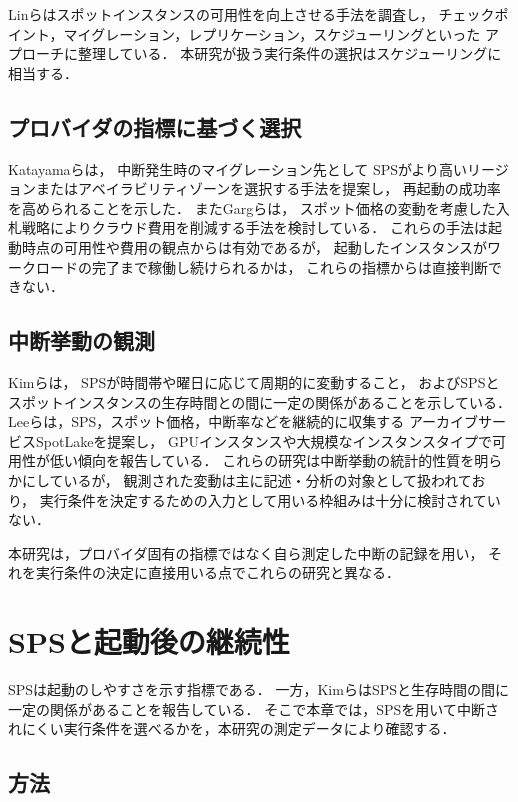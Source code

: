 \documentclass[submit,techrep,noauthor]{ipsj}
\begin{document}
Linら\cite{Lin2022Survey}はスポットインスタンスの可用性を向上させる手法を調査し，
チェックポイント，マイグレーション，レプリケーション，スケジューリングといった
アプローチに整理している．
本研究が扱う実行条件の選択はスケジューリングに相当する．

\subsection{プロバイダの指標に基づく選択}

Katayamaら\cite{Katayama2022}は，
中断発生時のマイグレーション先として
SPSがより高いリージョンまたはアベイラビリティゾーンを選択する手法を提案し，
再起動の成功率を高められることを示した．
またGargら\cite{Garg2025}は，
スポット価格の変動を考慮した入札戦略によりクラウド費用を削減する手法を検討している．
これらの手法は起動時点の可用性や費用の観点からは有効であるが，
起動したインスタンスがワークロードの完了まで稼働し続けられるかは，
これらの指標からは直接判断できない．

\subsection{中断挙動の観測}

Kimら\cite{Kim2024SpotInterruption}は，
SPSが時間帯や曜日に応じて周期的に変動すること，
およびSPSとスポットインスタンスの生存時間との間に一定の関係があることを示している．
Leeら\cite{Lee2022SpotLake}は，SPS，スポット価格，中断率などを継続的に収集する
アーカイブサービスSpotLakeを提案し，
GPUインスタンスや大規模なインスタンスタイプで可用性が低い傾向を報告している．
これらの研究は中断挙動の統計的性質を明らかにしているが，
観測された変動は主に記述・分析の対象として扱われており，
実行条件を決定するための入力として用いる枠組みは十分に検討されていない．

本研究は，プロバイダ固有の指標ではなく自ら測定した中断の記録を用い，
それを実行条件の決定に直接用いる点でこれらの研究と異なる．


\section{SPSと起動後の継続性}
\label{sec:prelim}

SPSは起動のしやすさを示す指標である．
一方，Kimら\cite{Kim2024SpotInterruption}はSPSと生存時間の間に一定の関係があることを報告している．
そこで本章では，SPSを用いて中断されにくい実行条件を選べるかを，本研究の測定データにより確認する．

\subsection{方法}
\end{document}
